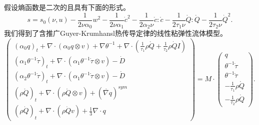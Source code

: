 假设熵函数是二次的且具有下面的形式。
	\begin{equation*}
		s = s_0(\nu,u)  - \frac{1}{2\nu \alpha_0} w^2 - \frac{1}{2\nu \alpha_1} \dot{c}^2- \frac{1}{2\alpha_2 \nu} \mathring{c}:\mathring{c} - \frac{1}{2 \tau_1 \nu} \mathring{Q}: \mathring{Q} - \frac{1}{2  \tau_2 \nu} \dot{Q}^2.
 	\end{equation*}  
我们得到了含推广Guyer-Krumhansl热传导定律的线性粘弹性流体模型。
\begin{equation}\label{eq:CNSTgeneral}
   	\left( \begin{array}{c} 
			(\alpha_0 q)_t +  \nabla \cdot (\alpha_0  q \otimes v)  + \nabla \theta^{-1} + \nabla \cdot (\frac{1}{\tau_1} \rho \mathring{{Q}}+\frac{1}{\tau_2} \rho \dot{Q} I)\\
			(\alpha_1 \theta^{-1} \dot{\tau})_t +  \nabla \cdot (\alpha_1 \theta^{-1} \dot{\tau} \otimes v)  - \dot{D} \\
			(\alpha_2 \theta^{-1} \mathring{\tau})_t +  \nabla \cdot (\alpha_1 \theta^{-1} \mathring{\tau} \otimes v)  - \mathring{D} \\
			(\rho \mathring{{Q}})_t + \nabla \cdot (\rho \mathring{Q} \otimes v)+(\mathring{\nabla {q}})^{sym} \\ (\rho \dot{Q})_t + \nabla \cdot (\rho \dot{Q} v)+\frac{1}{3} \nabla \cdot {q}
		\end{array} \right) = M \cdot
		\left( \begin{array}{c} 
			q \\ \theta^{-1} \dot{\tau} \\ \theta^{-1} \mathring{\tau} \\ -\frac{1}{\tau_1} \rho \mathring{{Q}} \\ -\frac{1}{\tau_2} \rho \dot{{Q}}
		\end{array}\right).
\end{equation}

